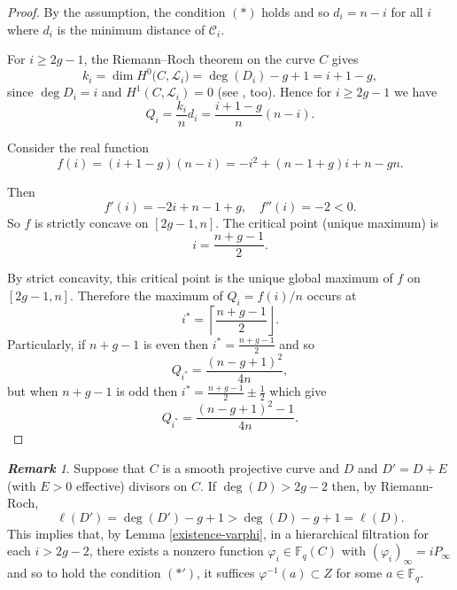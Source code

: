 \documentclass[14pt]{amsart}
\theoremstyle{plain}
\theoremstyle{definition}
\theoremstyle{remark}
\newtheorem{rem}[thm]{\bf Remark}
\theoremstyle{example}
\def \F{\mathbb{F}}
\def \L{\mathcal{L}}
\def \C{\mathcal{C}}
\begin{document}
\begin{proof}
By the assumption, the condition $(*)$ holds and so $d_i=n-i$ for all $i$ where $d_i$ is the minimum distance of $\C_i$. 

For $i\geq 2g-1$, the Riemann–Roch theorem on the curve $C$ gives
$$k_i=\dim H^0\bigl(C,\L_i\bigr)=\deg(D_i)-g+1=i+1-g,$$
since $\deg D_i=i$ and $H^1(C,\L_i)=0$ (see \cite[Corollary 2.2.3]{St}, too).
Hence for $i\ge 2g-1$ we have
$$Q_i=\frac{k_i}{n} d_i=\frac{i+1-g}{n}(n-i).$$

Consider the real function
$$f(i)=(i+1-g)(n-i)=-i^2+(n-1+g)i+n-gn.$$

Then
$$f'(i)=-2i+n-1+g,\quad f''(i)=-2<0.$$
So $f$ is strictly concave on $[2g-1,n]$. The critical point (unique maximum) is
$$i=\frac{n+g-1}{2}.$$

By strict concavity, this critical point is the unique global maximum of $f$ on $[2g-1,n]$. Therefore the maximum of $Q_i=f(i)/n$ occurs at
$$
i^*
=\left\lceil \frac{n+g-1}{2} \right\rfloor.
$$
Particularly, if $n+g-1$ is even then $i^*=\frac{n+g-1}{2}$ and so
$$Q_{i^*}=\frac{(n-g+1)^2}{4n},$$
but when $n+g-1$ is odd then $i^*=\frac{n+g-1}{2}\pm\frac{1}{2}$ which give
$$Q_{i^*}=\frac{(n-g+1)^2-1}{4n}.$$
\end{proof}

\begin{rem}
Suppose that $C$ is a smooth projective curve and $D$ and $D'=D+E$ (with $E>0$ effective) divisors on $C$. If $\deg(D)>2g-2$ then, by Riemann-Roch, 
$$\ell(D')=\deg(D')-g+1>\deg(D)-g+1=\ell(D).$$
This implies that, by Lemma \ref{existence-varphi}, in a hierarchical filtration for each $i>2g-2$, there exists a nonzero function $\varphi_i\in\F_{q}(C)$ with $(\varphi_i)_\infty=iP_\infty$ and so to hold the condition $(*')$, it suffices $\varphi^{-1}(a)\subset Z$ for some $a\in\F_q$.
\end{rem}

\end{document}
